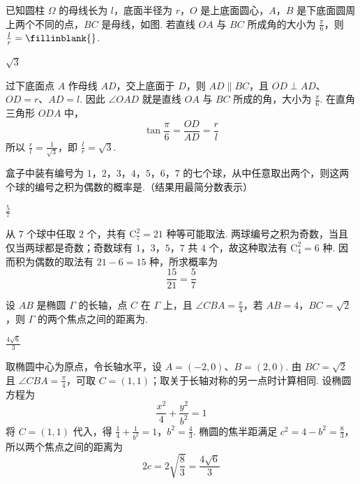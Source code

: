 \begin{problem}
已知圆柱 \(\Omega\) 的母线长为 \(l\)，底面半径为 \(r\)，\(O\) 是上底面圆心，\(A\)，\(B\) 是下底面圆周上两个不同的点，\(BC\) 是母线，如图. 若直线 \(OA\) 与 \(BC\) 所成角的大小为 \(\frac{\pi}{6}\)，则 \(\frac{l}{r} =\fillinblank{}\).


\begin{answer}
\(\sqrt{3}\)
\end{answer}

\begin{solution}
过下底面点 \(A\) 作母线 \(AD\)，交上底面于 \(D\)，则 \(AD\parallel BC\)，且 \(OD\perp AD\)、\(OD=r\)、\(AD=l\). 因此 \(\angle OAD\) 就是直线 \(OA\) 与 \(BC\) 所成的角，大小为 \(\frac{\pi}{6}\). 在直角三角形 \(ODA\) 中，
\[
\tan\frac{\pi}{6}=\frac{OD}{AD}=\frac{r}{l}
\]
所以 \(\frac{r}{l}=\frac{1}{\sqrt{3}}\)，即 \(\frac{l}{r}=\sqrt{3}\).
\end{solution}
\end{problem}

\begin{problem}
盒子中装有编号为 \(1\)，\(2\)，\(3\)，\(4\)，\(5\)，\(6\)，\(7\) 的七个球，从中任意取出两个，则这两个球的编号之积为偶数的概率是\fillinblank{}.（结果用最简分数表示）

\begin{answer}
\(\frac{5}{7}\)
\end{answer}

\begin{solution}
从 \(7\) 个球中任取 \(2\) 个，共有 \(\mathrm C_7^2=21\) 种等可能取法. 两球编号之积为奇数，当且仅当两球都是奇数；奇数球有 \(1\)，\(3\)，\(5\)，\(7\) 共 \(4\) 个，故这种取法有 \(\mathrm C_4^2=6\) 种. 因而积为偶数的取法有 \(21-6=15\) 种，所求概率为
\[
\frac{15}{21}=\frac{5}{7}
\]
\end{solution}
\end{problem}

\begin{problem}
设 \(AB\) 是椭圆 \(\Gamma\) 的长轴，点 \(C\) 在 \(\Gamma\) 上，且 \(\angle CBA = \frac{\pi}{4}\)，若 \(AB = 4\)，\(BC = \sqrt{2}\)，则 \(\Gamma\) 的两个焦点之间的距离为\fillinblank{}.

\begin{answer}
\(\frac{4\sqrt{6}}{3}\)
\end{answer}

\begin{solution}
取椭圆中心为原点，令长轴水平，设 \(A=(-2,0)\)、\(B=(2,0)\). 由 \(BC=\sqrt{2}\) 且 \(\angle CBA=\frac{\pi}{4}\)，可取 \(C=(1,1)\)；取关于长轴对称的另一点时计算相同. 设椭圆方程为
\[
\frac{x^2}{4}+\frac{y^2}{b^2}=1
\]
将 \(C=(1,1)\) 代入，得
\(\frac14+\frac{1}{b^2}=1\)，\(b^2=\frac43\).
椭圆的焦半距满足 \(c^2=4-b^2=\frac83\)，所以两个焦点之间的距离为
\[
2c=2\sqrt{\frac83}=\frac{4\sqrt6}{3}
\]
\end{solution}
\end{problem}

